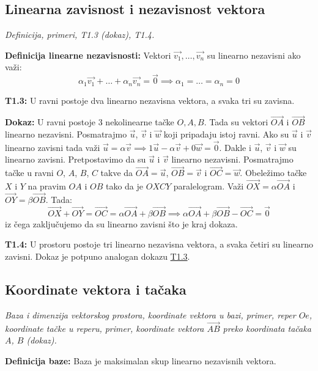 \documentclass[12pt]{article}
\newcommand{\vek}[1]{\overrightarrow{#1}}
\begin{document}
\subsection{Linearna zavisnost i nezavisnost vektora}
\textit{Definicija, primeri, T1.3 (dokaz), T1.4.}
\par
\vspace*{1cm}

\textbf{Definicija linearne nezavisnosti:} Vektori $\vek{v_1},\dotsc,\vek{v_n}$
su linearno nezavisni ako važi:
$$\alpha_1\vek{v_1}+\dotsc+\alpha_n\vek{v_n}=\vek{0} \implies \alpha_1=
    \dotsc=\alpha_n=0$$
\par

\textbf{T1.3:}\label{theorem:1.3} U ravni postoje dva linearno nezavisna
vektora, a svaka tri su zavisna.
\par
\textbf{Dokaz:} U ravni postoje 3 nekolinearne tačke $O, A, B$. Tada su vektori
$\vek{OA}$ i $\vek{OB}$ linearno nezavisni. Posmatrajmo $\vek{u}$, $\vek{v}$ i
$\vek{w}$ koji pripadaju istoj ravni. Ako su $\vek{u}$ i $\vek{v}$ linearno
zavisni tada važi $\vek{u}=\alpha\vek{v}\implies 1\vek{u}-\alpha\vek{v}+
    0\vek{w}=\vek{0}$. Dakle i $\vek{u}$, $\vek{v}$ i $\vek{w}$ su linearno
zavisni. Pretpostavimo da su $\vek{u}$ i $\vek{v}$ linearno nezavisni.
Posmatrajmo tačke u ravni $O$, $A$, $B$, $C$ takve da $\vek{OA}=\vek{u}$,
$\vek{OB}=\vek{v}$ i $\vek{OC}=\vek{w}$. Obeležimo tačke $X$ i $Y$ na pravim
$OA$ i $OB$ tako da je $OXCY$ paralelogram. Važi $\vek{OX}=\alpha\vek{OA}$ i
$\vek{OY}=\beta\vek{OB}$. Tada:
$$\vek{OX}+\vek{OY}=\vek{OC}=\alpha\vek{OA}+\beta\vek{OB} \implies
    \alpha\vek{OA}+\beta\vek{OB}-\vek{OC}=\vek{0}$$
iz čega zaključujemo da su linearno zavisni što je kraj dokaza.
\par

\textbf{T1.4:} U prostoru postoje tri linearno nezavisna vektora, a svaka
četiri su linearno zavisni. Dokaz je potpuno analogan dokazu
\hyperref[theorem:1.3]{T1.3}.


\subsection{Koordinate vektora i tačaka}
\textit{Baza i dimenzija vektorskog prostora, koordinate vektora u bazi,
    primer, reper $Oe$, koordinate tačke u reperu, primer, koordinate vektora
    $\vek{AB}$ preko koordinata tačaka $A$, $B$ (dokaz).}
\par
\vspace*{1cm}

\textbf{Definicija baze:} Baza je maksimalan skup linearno nezavisnih vektora.
\par
\end{document}
